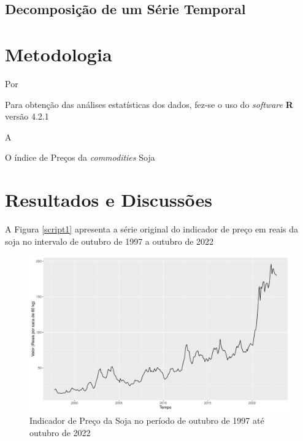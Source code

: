 \documentclass[
	12pt,				%
	openright,			%
	oneside,      %
	a4paper,			%
	english,			%
	french,				%
	spanish,			%
	brazil,				%
	]{abntex2}\usepackage[]{graphicx}\usepackage[]{xcolor}
\makeatletter
\def\maxwidth{ %
  \ifdim\Gin@nat@width>\linewidth
    \linewidth
  \else
    \Gin@nat@width
  \fi
}
\newenvironment{knitrout}{}{} %
\makeatother
\begin{document}
  \section{Decomposição de um Série Temporal}





\chapter{Metodologia}

Por 


Para obtenção das análises estatísticas dos dados, fez-se o uso do \textit{software} \textbf{R} versão 4.2.1


A 


O índice de Preços da \textit{commodities} Soja 




\chapter{Resultados e Discussões}





A Figura \ref{script1} apresenta a série original do indicador de preço em reais da soja no intervalo de outubro de 1997 a outubro de 2022 

\begin{knitrout}
\color{fgcolor}\begin{figure}
\includegraphics[width=\maxwidth]{figure/script1-1} \caption[Indicador de Preço da Soja no período de outubro de 1997 até outubro de 2022]{Indicador de Preço da Soja no período de outubro de 1997 até outubro de 2022}\label{fig:script1}
\end{figure}

\end{knitrout}
\end{document}
